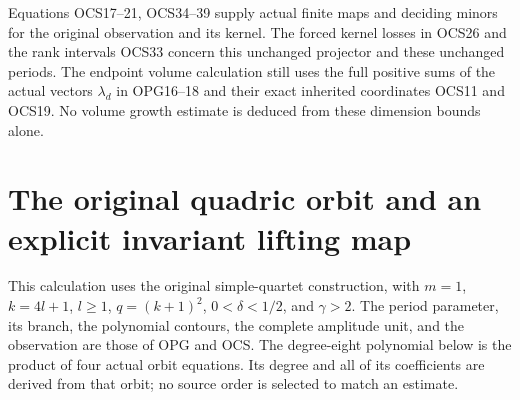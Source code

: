 \documentclass[11pt,a4paper]{article}
\begin{document}
Equations OCS17--21, OCS34--39 supply actual finite maps
and deciding minors for the original observation and its
kernel. The forced kernel losses in OCS26 and the rank
intervals OCS33 concern this unchanged projector and these
unchanged periods. The endpoint volume calculation still
uses the full positive sums of the actual vectors
$\lambda_d$ in OPG16--18 and their exact inherited
coordinates OCS11 and OCS19. No volume growth estimate
is deduced from these dimension bounds alone.



\section{The original quadric orbit and an explicit invariant lifting map}
\label{sec:OQC}

This calculation uses the original simple-quartet construction, with
$m=1$, $k=4l+1$, $l\geq1$, $q=(k+1)^2$, $0<\delta<1/2$, and
$\gamma>2$. The period parameter, its branch, the polynomial contours,
the complete amplitude unit, and the observation are those of OPG and
OCS. The degree-eight polynomial below is the product of four actual
orbit equations. Its degree and all of its coefficients are derived
from that orbit; no source order is selected to match an estimate.
\end{document}
